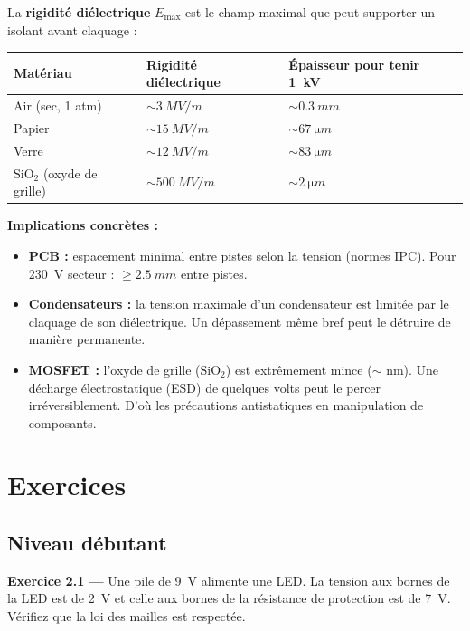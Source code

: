 \documentclass[12pt,a4paper,twoside]{book}
\begin{document}
La \textbf{rigidité diélectrique} $E_{\text{max}}$ est le champ maximal que peut supporter un isolant avant claquage :

\begin{center}
\begin{tabular}{lll}
\toprule
\textbf{Matériau} & \textbf{Rigidité diélectrique} & \textbf{Épaisseur pour tenir \SI{1}{kV}} \\
\midrule
Air (sec, 1 atm) & $\sim \SI{3}{MV/m}$ & $\sim \SI{0.3}{mm}$ \\
Papier & $\sim \SI{15}{MV/m}$ & $\sim \SI{67}{\micro m}$ \\
Verre & $\sim \SI{12}{MV/m}$ & $\sim \SI{83}{\micro m}$ \\
$\text{SiO}_2$ (oxyde de grille) & $\sim \SI{500}{MV/m}$ & $\sim \SI{2}{\micro m}$ \\
\bottomrule
\end{tabular}
\end{center}

\begin{pratique}
\textbf{Implications concrètes :}
\begin{itemize}[nosep]
\item \textbf{PCB :} espacement minimal entre pistes selon la tension (normes IPC). Pour \SI{230}{V} secteur : $\geq \SI{2.5}{mm}$ entre pistes.
\item \textbf{Condensateurs :} la tension maximale d'un condensateur est limitée par le claquage de son diélectrique. Un dépassement même bref peut le détruire de manière permanente.
\item \textbf{MOSFET :} l'oxyde de grille ($\text{SiO}_2$) est extrêmement mince ($\sim$ nm). Une décharge électrostatique (ESD) de quelques volts peut le percer irréversiblement. D'où les précautions antistatiques en manipulation de composants.
\end{itemize}
\end{pratique}

\section*{Exercices}

\subsection*{Niveau débutant}

\textbf{Exercice 2.1 —} Une pile de \SI{9}{V} alimente une LED. La tension aux bornes de la LED est de \SI{2}{V} et celle aux bornes de la résistance de protection est de \SI{7}{V}. Vérifiez que la loi des mailles est respectée.
\end{document}
